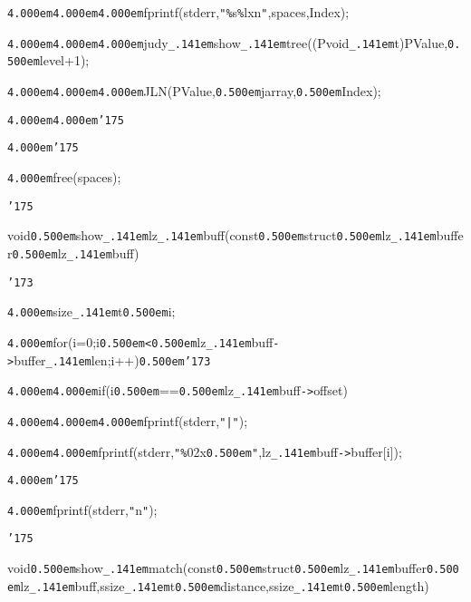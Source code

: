 \noindent
{}{\tt\mc \kern4.000em}{\tt\mc \kern4.000em}{\tt\mc \kern4.000em}fprintf(stderr,{\tt "}{\tt\%}s{\tt\%}lx{\tt{}}n{\tt "},spaces,Index);

\noindent
{}{\tt\mc \kern4.000em}{\tt\mc \kern4.000em}{\tt\mc \kern4.000em}judy{\tt\_\kern.141em}show{\tt\_\kern.141em}tree((Pvoid{\tt\_\kern.141em}t){\tt *}PValue,{\tt\mc \kern0.500em}level+1);

\noindent
{}{\tt\mc \kern4.000em}{\tt\mc \kern4.000em}{\tt\mc \kern4.000em}JLN(PValue,{\tt\mc \kern0.500em}jarray,{\tt\mc \kern0.500em}Index);

\noindent
{}{\tt\mc \kern4.000em}{\tt\mc \kern4.000em}{\tt\char'175}

\noindent
{}{\tt\mc \kern4.000em}{\tt\char'175}

\noindent
{}{\tt\mc \kern4.000em}free(spaces);

\noindent
{}{\tt\char'175}

\noindent
{}\hfill

\noindent
{}void{\tt\mc \kern0.500em}show{\tt\_\kern.141em}lz{\tt\_\kern.141em}buff(const{\tt\mc \kern0.500em}struct{\tt\mc \kern0.500em}lz{\tt\_\kern.141em}buffer{\tt *}{\tt\mc \kern0.500em}lz{\tt\_\kern.141em}buff)

\noindent
{}{\tt\char'173}

\noindent
{}{\tt\mc \kern4.000em}size{\tt\_\kern.141em}t{\tt\mc \kern0.500em}i;

\noindent
{}{\tt\mc \kern4.000em}for(i=0;i{\tt\mc \kern0.500em}{\tt <}{\tt\mc \kern0.500em}lz{\tt\_\kern.141em}buff{\tt -}{\tt >}buffer{\tt\_\kern.141em}len;i++){\tt\mc \kern0.500em}{\tt\char'173}

\noindent
{}{\tt\mc \kern4.000em}{\tt\mc \kern4.000em}if(i{\tt\mc \kern0.500em}=={\tt\mc \kern0.500em}lz{\tt\_\kern.141em}buff{\tt -}{\tt >}offset)

\noindent
{}{\tt\mc \kern4.000em}{\tt\mc \kern4.000em}{\tt\mc \kern4.000em}fprintf(stderr,{\tt "}{\tt |}{\tt "});

\noindent
{}{\tt\mc \kern4.000em}{\tt\mc \kern4.000em}fprintf(stderr,{\tt "}{\tt\%}02x{\tt\mc \kern0.500em}{\tt "},lz{\tt\_\kern.141em}buff{\tt -}{\tt >}buffer[i]);

\noindent
{}{\tt\mc \kern4.000em}{\tt\char'175}

\noindent
{}{\tt\mc \kern4.000em}fprintf(stderr,{\tt "}{\tt{}}n{\tt "});

\noindent
{}{\tt\char'175}

\noindent
{}\hfill

\noindent
{}void{\tt\mc \kern0.500em}show{\tt\_\kern.141em}match(const{\tt\mc \kern0.500em}struct{\tt\mc \kern0.500em}lz{\tt\_\kern.141em}buffer{\tt *}{\tt\mc \kern0.500em}lz{\tt\_\kern.141em}buff,ssize{\tt\_\kern.141em}t{\tt\mc \kern0.500em}distance,ssize{\tt\_\kern.141em}t{\tt\mc \kern0.500em}length)

